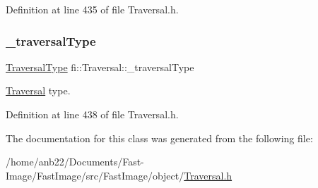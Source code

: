 Definition at line 435 of file Traversal.\+h.

\mbox{\label{classfi_1_1Traversal_a5c057650bf7806bb4af697b3c6a2aac0}} 
\subsubsection{\texorpdfstring{\+\_\+traversal\+Type}{\_traversalType}}
{\footnotesize\ttfamily \hyperlink{namespacefi_a7ba5ce68668e7f273b22e5f56ca6dfcb}{Traversal\+Type} fi\+::\+Traversal\+::\+\_\+traversal\+Type\hspace{0.3cm}{\ttfamily [private]}}



\hyperlink{classfi_1_1Traversal}{Traversal} type. 



Definition at line 438 of file Traversal.\+h.



The documentation for this class was generated from the following file\+:\begin{DoxyCompactItemize}
\item 
/home/anb22/\+Documents/\+Fast-\/\+Image/\+Fast\+Image/src/\+Fast\+Image/object/\hyperlink{Traversal_8h}{Traversal.\+h}\end{DoxyCompactItemize}
